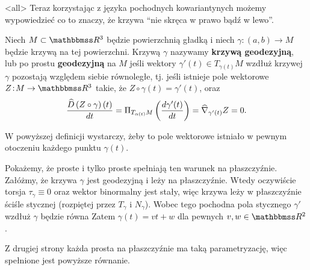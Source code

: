\mode<all>{}
Teraz korzystając z języka pochodnych kowariantynych możemy wypowiedzieć co to znaczy, że krzywa ``nie skręca w prawo bądź w lewo''. 
\begin{frame}

\begin{definicja}
Niech $M\subset \R^3$ będzie powierzchnią gładką i niech $\gamma\colon (a,b)\to M$ będzie krzywą na tej powierzchni. Krzywą $\gamma$ nazywamy \textbf{krzywą geodezyjną}, lub po prostu \textbf{geodezyjną} na $M$ jeśli wektory $\gamma'(t)\in T_{\gamma(t)}M$ wzdłuż krzywej $\gamma$ pozostają względem siebie równoległe\pause, tj. jeśli istnieje pole wektorowe $Z\colon M\to \R^3$ takie, że $Z\circ \gamma(t)=\gamma'(t)$, oraz \[\frac{\widehat{D}\left(Z\circ\gamma\right)(t)}{dt}=\Pi_{T_{\alpha(t)}M}\left(\frac{d \gamma'(t)}{dt}\right)= \widehat{\nabla}_{\gamma'(t)}Z=0.\]
\end{definicja}

\pause\begin{uwaga}
W powyższej definicji wystarczy, żeby to pole wektorowe istniało w pewnym otoczeniu każdego punktu $\gamma(t)$.
\end{uwaga}

\end{frame}
\begin{frame}

\begin{przyklad} 
Pokażemy, że proste i tylko proste spełniają ten warunek na płaszczyźnie. \pause Załóżmy, że krzywa $\gamma$ jest geodezyjną i leży na płaszczyźnie. Wtedy oczywiście torsja $\tau_\gamma\equiv0$ oraz wektor binormalny jest stały, więc krzywa leży w płaszczyźnie ściśle stycznej (rozpiętej przez $T_\gamma$ i $N_\gamma$). \pause Wobec tego pochodna pola stycznego $\gamma'$ wzdłuż $\gamma$ będzie równa
Zatem $\gamma(t)=vt+w$ dla pewnych $v,w\in \R^2$.

\pause Z drugiej strony każda prosta na płaszczyźnie ma taką parametryzację, więc spełnione jest powyższe równanie.
\end{przyklad}

\end{frame}
